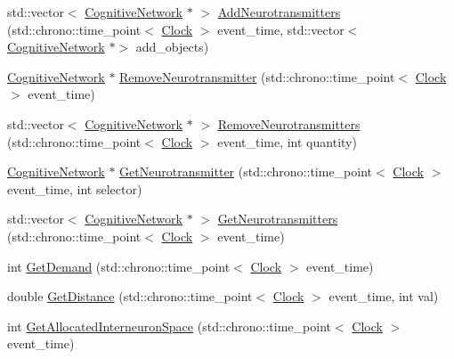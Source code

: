 \begin{DoxyCompactItemize}
std\+::vector$<$ \hyperlink{class_cognitive_network}{Cognitive\+Network} $\ast$ $>$ \hyperlink{class_interneuron_space_a1049397cd511c753d8c178db8f68a1a7}{Add\+Neurotransmitters} (std\+::chrono\+::time\+\_\+point$<$ \hyperlink{universe_8h_a0ef8d951d1ca5ab3cfaf7ab4c7a6fd80}{Clock} $>$ event\+\_\+time, std\+::vector$<$ \hyperlink{class_cognitive_network}{Cognitive\+Network} $\ast$$>$ add\+\_\+objects)
\item 
\hyperlink{class_cognitive_network}{Cognitive\+Network} $\ast$ \hyperlink{class_interneuron_space_aa46b5ce238b49425a68fcfd53ba1d8b7}{Remove\+Neurotransmitter} (std\+::chrono\+::time\+\_\+point$<$ \hyperlink{universe_8h_a0ef8d951d1ca5ab3cfaf7ab4c7a6fd80}{Clock} $>$ event\+\_\+time)
\item 
std\+::vector$<$ \hyperlink{class_cognitive_network}{Cognitive\+Network} $\ast$ $>$ \hyperlink{class_interneuron_space_a7b11f542ab7a3d293d5fcf5a1b522ac2}{Remove\+Neurotransmitters} (std\+::chrono\+::time\+\_\+point$<$ \hyperlink{universe_8h_a0ef8d951d1ca5ab3cfaf7ab4c7a6fd80}{Clock} $>$ event\+\_\+time, int quantity)
\item 
\hyperlink{class_cognitive_network}{Cognitive\+Network} $\ast$ \hyperlink{class_interneuron_space_a7a60c95c8706cbff3084e74b7b15d75c}{Get\+Neurotransmitter} (std\+::chrono\+::time\+\_\+point$<$ \hyperlink{universe_8h_a0ef8d951d1ca5ab3cfaf7ab4c7a6fd80}{Clock} $>$ event\+\_\+time, int selector)
\item 
std\+::vector$<$ \hyperlink{class_cognitive_network}{Cognitive\+Network} $\ast$ $>$ \hyperlink{class_interneuron_space_aaae45b76a4c059aae1e27bde3901371c}{Get\+Neurotransmitters} (std\+::chrono\+::time\+\_\+point$<$ \hyperlink{universe_8h_a0ef8d951d1ca5ab3cfaf7ab4c7a6fd80}{Clock} $>$ event\+\_\+time)
\item 
int \hyperlink{class_interneuron_space_ae62237c3a84893c81e9998602ab16718}{Get\+Demand} (std\+::chrono\+::time\+\_\+point$<$ \hyperlink{universe_8h_a0ef8d951d1ca5ab3cfaf7ab4c7a6fd80}{Clock} $>$ event\+\_\+time)
\item 
double \hyperlink{class_interneuron_space_a634322f8b405ead2dc51afb0a5c3d725}{Get\+Distance} (std\+::chrono\+::time\+\_\+point$<$ \hyperlink{universe_8h_a0ef8d951d1ca5ab3cfaf7ab4c7a6fd80}{Clock} $>$ event\+\_\+time, int val)
\item 
int \hyperlink{class_interneuron_space_a4b053dc94a921c8176d9f58d40169089}{Get\+Allocated\+Interneuron\+Space} (std\+::chrono\+::time\+\_\+point$<$ \hyperlink{universe_8h_a0ef8d951d1ca5ab3cfaf7ab4c7a6fd80}{Clock} $>$ event\+\_\+time)
\item 
$$
\end{DoxyCompactItemize}
